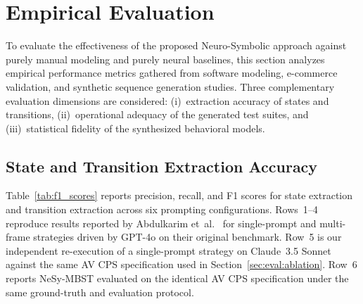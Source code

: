 

\section{Empirical Evaluation}%
\label{sec:evaluation}

To evaluate the effectiveness of the proposed Neuro-Symbolic approach
against purely manual modeling and purely neural baselines, this section
analyzes empirical performance metrics gathered from software modeling,
e-commerce validation, and synthetic sequence generation studies.  Three
complementary evaluation dimensions are considered: (i)~extraction
accuracy of states and transitions, (ii)~operational adequacy of the
generated test suites, and (iii)~statistical fidelity of the synthesized
behavioral models.


\subsection{State and Transition Extraction Accuracy}%
\label{sec:eval:extraction}

Table~\ref{tab:f1_scores} reports precision, recall, and F1 scores for
state extraction and transition extraction across six prompting
configurations.  Rows~1--4 reproduce results reported by Abdulkarim
et~al.~\cite{llm_state_machine_frameworks} for single-prompt and
multi-frame strategies driven by GPT-4o on their original benchmark.
Row~5 is our independent re-execution of a single-prompt strategy on
Claude~3.5 Sonnet against the same AV CPS specification used in
Section~\ref{sec:eval:ablation}.  Row~6 reports NeSy-MBST evaluated on
the identical AV CPS specification under the same ground-truth and
evaluation protocol.

